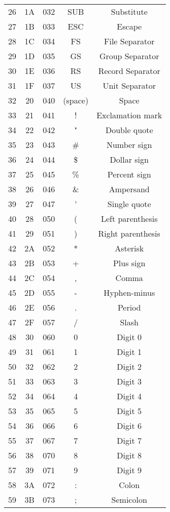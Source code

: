 \documentclass[12pt]{article} %
\begin{document}
\begin{longtable}{|c|c|c|c|c|}
    26 & 1A & 032 & SUB & Substitute \\
    27 & 1B & 033 & ESC & Escape \\
    28 & 1C & 034 & FS  & File Separator \\
    29 & 1D & 035 & GS  & Group Separator \\
    30 & 1E & 036 & RS  & Record Separator \\
    31 & 1F & 037 & US  & Unit Separator \\
    32 & 20 & 040 & (space) & Space \\
    33 & 21 & 041 & ! & Exclamation mark \\
    34 & 22 & 042 & " & Double quote \\
    35 & 23 & 043 & \# & Number sign \\
    36 & 24 & 044 & \$ & Dollar sign \\
    37 & 25 & 045 & \% & Percent sign \\
    38 & 26 & 046 & \& & Ampersand \\
    39 & 27 & 047 & ' & Single quote \\
    40 & 28 & 050 & ( & Left parenthesis \\
    41 & 29 & 051 & ) & Right parenthesis \\
    42 & 2A & 052 & * & Asterisk \\
    43 & 2B & 053 & + & Plus sign \\
    44 & 2C & 054 & , & Comma \\
    45 & 2D & 055 & - & Hyphen-minus \\
    46 & 2E & 056 & . & Period \\
    47 & 2F & 057 & / & Slash \\
    48 & 30 & 060 & 0 & Digit 0 \\
    49 & 31 & 061 & 1 & Digit 1 \\
    50 & 32 & 062 & 2 & Digit 2 \\
    51 & 33 & 063 & 3 & Digit 3 \\
    52 & 34 & 064 & 4 & Digit 4 \\
    53 & 35 & 065 & 5 & Digit 5 \\
    54 & 36 & 066 & 6 & Digit 6 \\
    55 & 37 & 067 & 7 & Digit 7 \\
    56 & 38 & 070 & 8 & Digit 8 \\
    57 & 39 & 071 & 9 & Digit 9 \\
    58 & 3A & 072 & : & Colon \\
    59 & 3B & 073 & ; & Semicolon \\

\end{longtable}
\end{document}
